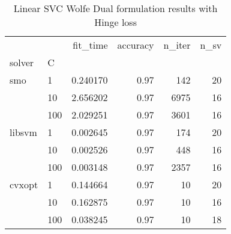 \begin{table}[H]
\centering
\caption{Linear SVC Wolfe Dual formulation results with Hinge loss}
\label{linear_dual_svc_cv_results}
\begin{tabular}{llrrrr}
\toprule
       &     &  fit\_time &  accuracy &  n\_iter &  n\_sv \\
solver & C &           &           &         &       \\
\midrule
smo & 1   &  0.240170 &      0.97 &     142 &    20 \\
       & 10  &  2.656202 &      0.97 &    6975 &    16 \\
       & 100 &  2.029251 &      0.97 &    3601 &    16 \\
libsvm & 1   &  0.002645 &      0.97 &     174 &    20 \\
       & 10  &  0.002526 &      0.97 &     448 &    16 \\
       & 100 &  0.003148 &      0.97 &    2357 &    16 \\
cvxopt & 1   &  0.144664 &      0.97 &      10 &    20 \\
       & 10  &  0.162875 &      0.97 &      10 &    16 \\
       & 100 &  0.038245 &      0.97 &      10 &    18 \\
\bottomrule
\end{tabular}
\end{table}
